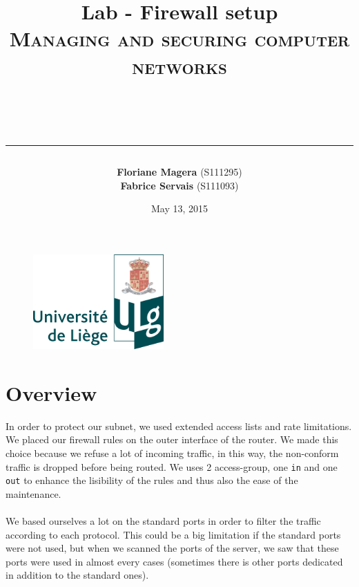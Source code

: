 \documentclass[a4paper,titlepage]{article}
\begin{document}
\begin{titlepage}

\begin{figure}
\centering
\includegraphics[width=5cm]{logo-ulg.png}
\end{figure}



\title{
\vspace{0.2cm}
\LARGE{\textbf{Lab - Firewall setup }} \\ \textsc{Managing and securing computer networks}
\author{\textbf{Floriane Magera} \small{(S111295})\\\textbf{Fabrice Servais} \small{(S111093})}\\
\date{May 13, 2015}
\rule{15cm}{1.5pt}
}

\end{titlepage}

\pagestyle{fancy}

\maketitle

\section{Overview}
In order to protect our subnet, we used extended access lists and rate limitations. We placed our firewall rules on the outer interface of the router. We made this choice because we refuse a lot of incoming traffic, in this way, the non-conform traffic is dropped before being routed. We uses 2 access-group, one \texttt{in} and one \texttt{out} to enhance the lisibility of the rules and thus also the ease of the maintenance.

\paragraph{}
 We based ourselves a lot on the standard ports in order to filter the traffic according to each protocol. This could be a big limitation if the standard ports were not used, but when we scanned the ports of the server, we saw that these ports were used in almost every cases (sometimes there is other ports dedicated in addition to the standard ones).
\end{document}
